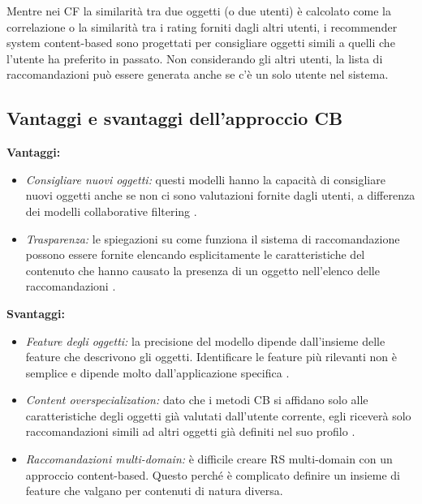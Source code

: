 Mentre nei CF la similarità tra due oggetti (o due utenti) è calcolato come la correlazione o la similarità tra i rating forniti dagli altri utenti, i recommender system content-based sono progettati per consigliare oggetti simili a quelli che l'utente ha preferito in passato. Non considerando gli altri utenti, la lista di raccomandazioni può essere generata anche se c'è un solo utente nel sistema.

\subsection{Vantaggi e svantaggi dell'approccio CB}
\textbf{Vantaggi:}
\begin{itemize}
 \item \textit{Consigliare nuovi oggetti:} questi modelli hanno la capacità di consigliare nuovi oggetti anche se non ci sono valutazioni fornite dagli utenti, a differenza dei modelli collaborative filtering \cite{recsys-principle-methods-evaluation}.
 
 \item \textit{Trasparenza:} le spiegazioni su come funziona il sistema di raccomandazione possono essere fornite elencando esplicitamente le caratteristiche del contenuto che hanno causato la presenza di un oggetto nell'elenco delle raccomandazioni \cite{transparency}. 
\end{itemize}

\noindent \textbf{Svantaggi:}
\begin{itemize}
 \item \textit{Feature degli oggetti:} la precisione del modello dipende dall'insieme delle feature che descrivono gli oggetti. Identificare le feature più rilevanti non è semplice e dipende molto dall'applicazione specifica \cite{survey-mattia}.
 
 \item \textit{Content overspecialization:} dato che i metodi CB si affidano solo alle caratteristiche degli oggetti già valutati dall'utente corrente, egli riceverà solo raccomandazioni simili ad altri oggetti già definiti nel suo profilo \cite{recsys-principle-methods-evaluation}.
 
 \item \textit{Raccomandazioni multi-domain:} è difficile creare RS multi-domain con un approccio content-based. Questo perché è complicato definire un insieme di feature che valgano per contenuti di natura diversa.
\end{itemize}

